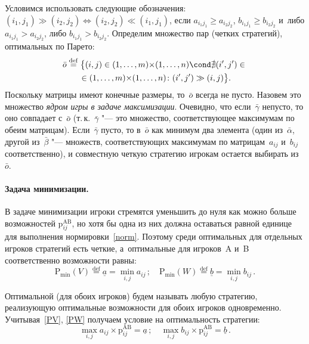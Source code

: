 \documentclass[twoside]{article}
\begin{document}
Условимся использовать следующие обозначения:
$(i_1,j_1)\gg(i_2,j_2)\Leftrightarrow(i_2,j_2)\ll(i_1,j_1)$, если $a_{i_1j_1}\ge a_{i_2j_2}$,\;
$b_{i_1j_1}\ge b_{i_2j_2}$ и~либо $a_{i_1j_1}>a_{i_2j_2}$, либо $b_{i_1j_1}>b_{i_2j_2}$. Определим
множество пар (четких стратегий), оптимальных по Парето:
    \begin{multline}
\bar
o\stackrel{\mathrm{def}}{=}\big\{(i,j)\in(1,\dots,m){\times}(1,\dots,n)\cond\nexists(i',j')\in{}
    \\
{}\in{}(1,\dots,m){\times}(1,\dots,n)\colon(i',j')\gg(i,j)\big\}.\label{oo}
    \end{multline}
Поскольку матрицы имеют конечные размеры, то~$\bar o$ всегда не пусто. Назовем это множество
\emph{ядром игры в задаче максимизации}. Очевидно, что если~$\bar\gamma$ не\-пус\-то, то оно
совпадает с~$\bar o$ (т.\,к.~$\bar\gamma$ "--- это множество, соответствующее максимумам по обеим
матрицам). Если~$\bar\gamma$ пусто, то в~$\bar o$ как минимум два элемента (один из~$\bar\alpha$,
другой из~$\bar\beta$ "--- множеств, соответствующих максимумам по матрицам~$a_{ij}$ и~$b_{ij}$
со\-от\-ветс\-твен\-но), и совместную четкую стратегию игрокам остается выбирать из $\bar o$.
\paragraph{Задача минимизации.}
В задаче минимизации игроки стремятся уменьшить до нуля как можно больше возможностей
$\mathrm{p}^\mathrm{AB}_{ij}$, но хотя бы одна из них должна оставаться равной единице для
выполнения нормировки~\eqref{norm}. Поэтому среди оптимальных для отдельных игроков стратегий есть
четкие, а~оптимальные для игроков~A и~B соответственно возможности равны:
    \[
\mathrm{P}_{\min}(V)\stackrel{\mathrm{def}}{=}\underline
a=\min_{i,j}a_{ij}\,;
    \quad
\mathrm{P}_{\min}(W)\stackrel{\mathrm{def}}{=}\underline
b=\min_{i,j}b_{ij}\,.
    \]

Оптимальной (для обоих игроков) будем называть любую стратегию, реализующую оптимальные возможности
для обоих игроков одновременно. Учитывая~\eqref{PV}, \eqref{PW} получаем условие на оптимальность
стратегии:
    \begin{equation}\label{optmin}
\max_{i,j}a_{ij}{\times}\mathrm{p}^\mathrm{AB}_{ij}=\underline a\,;
    \quad
\max_{i,j}b_{ij}{\times}\mathrm{p}^\mathrm{AB}_{ij}=\underline b\,.
    \end{equation}
\end{document}
